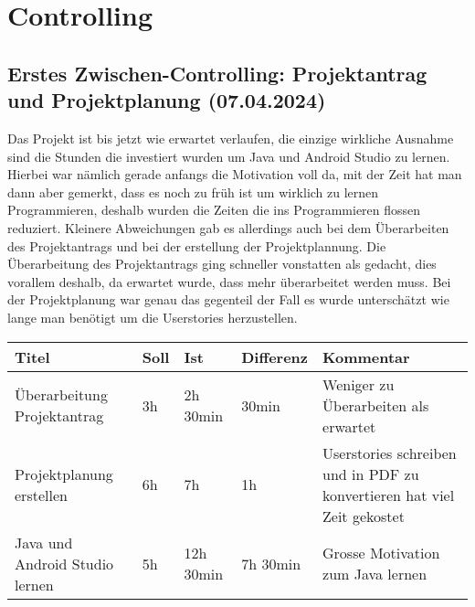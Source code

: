 \setcounter{chapter}{4}
\chapter{Controlling}
\section{Erstes Zwischen-Controlling: Projektantrag und Projektplanung (07.04.2024)}

Das Projekt ist bis jetzt wie erwartet verlaufen, die einzige wirkliche Ausnahme sind die Stunden die investiert wurden um Java und Android Studio zu lernen. Hierbei war nämlich gerade anfangs die Motivation voll da, mit der Zeit hat man dann aber gemerkt, dass es noch zu früh ist um wirklich zu lernen Programmieren, deshalb wurden die Zeiten die ins Programmieren flossen reduziert. Kleinere Abweichungen gab es allerdings auch bei dem Überarbeiten des Projektantrags und bei der erstellung der Projektplannung. Die Überarbeitung des Projektantrags ging schneller vonstatten als gedacht, dies vorallem deshalb, da erwartet wurde, dass mehr überarbeitet werden muss. Bei der Projektplanung war genau das gegenteil der Fall es wurde unterschätzt wie lange man benötigt um die Userstories herzustellen. \newline \newline \newline
\begin{tabular}{p{}|p{}|p{}|p{}|p{}}
    \textbf{Titel} & \textbf{Soll} & \textbf{Ist} & \textbf{Differenz} & \textbf{Kommentar} \\ \hline
    Überarbeitung Projektantrag & 3h & 2h 30min & 30min & Weniger zu Überarbeiten als erwartet \\ \hline
    Projektplanung erstellen & 6h & 7h & 1h & Userstories schreiben und in PDF zu konvertieren hat viel Zeit gekostet \\ \hline
    Java und Android Studio lernen & 5h & 12h 30min & 7h 30min & Grosse Motivation zum Java lernen
\end{tabular}